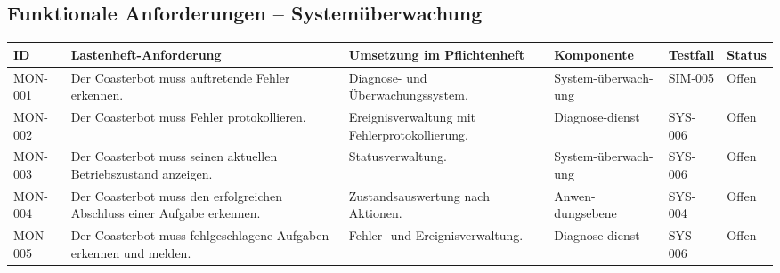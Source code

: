 \subsection{Funktionale Anforderungen --
Systemüberwachung}\label{funktionale-anforderungen-systemuxfcberwachung}

\begin{longtable}[]{@{}
  >{\raggedright\arraybackslash}p{}
  >{\raggedright\arraybackslash}p{}
  >{\raggedright\arraybackslash}p{}
  >{\raggedright\arraybackslash}p{}
  >{\raggedleft\arraybackslash}p{}
  >{\raggedright\arraybackslash}p{}@{}}
\toprule\noalign{}
\begin{minipage}[b]{\linewidth}\raggedright
ID
\end{minipage} & \begin{minipage}[b]{\linewidth}\raggedright
Lastenheft-Anforderung
\end{minipage} & \begin{minipage}[b]{\linewidth}\raggedright
Umsetzung im Pflichtenheft
\end{minipage} & \begin{minipage}[b]{\linewidth}\raggedright
Komponente
\end{minipage} & \begin{minipage}[b]{\linewidth}\raggedleft
Testfall
\end{minipage} & \begin{minipage}[b]{\linewidth}\raggedright
Status
\end{minipage} \\
\midrule\noalign{}
\endhead
\bottomrule\noalign{}
\endlastfoot
MON-001 & Der Coasterbot muss auftretende Fehler erkennen. & Diagnose-
und Überwachungssystem. & System-überwach-ung & SIM-005 & Offen \\
MON-002 & Der Coasterbot muss Fehler protokollieren. &
Ereignisverwaltung mit Fehlerprotokollierung. & Diagnose-dienst &
SYS-006 & Offen \\
MON-003 & Der Coasterbot muss seinen aktuellen Betriebszustand anzeigen.
& Statusverwaltung. & System-überwach-ung & SYS-006 & Offen \\
MON-004 & Der Coasterbot muss den erfolgreichen Abschluss einer Aufgabe
erkennen. & Zustandsauswertung nach Aktionen. & Anwen-dungsebene &
SYS-004 & Offen \\
MON-005 & Der Coasterbot muss fehlgeschlagene Aufgaben erkennen und
melden. & Fehler- und Ereignisverwaltung. & Diagnose-dienst & SYS-006 &
Offen \\
\end{longtable}

